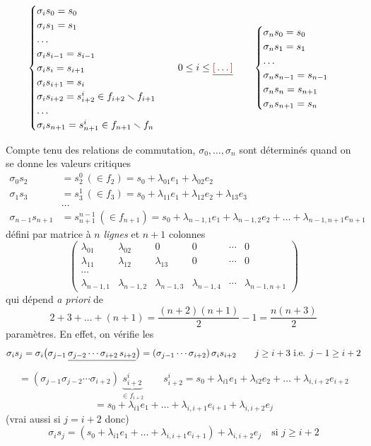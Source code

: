 \documentclass[11pt,a4paper]{article}
\begin{document}
\[
\begin{cases}
\sigma_i s_0 = s_0 \\
\sigma_i s_1 = s_1 \\
\dots \\
\sigma_i s_{i-1} = s_{i-1} \\
\sigma_i s_i = s_{i+1} \\
\sigma_i s_{i+1} = s_i \\
\sigma_i s_{i+2} = s_{i+2}^i \in f_{i+2}\smallsetminus f_{i+1} \\
\dots \\
\sigma_i s_{n+1} = s_{n+1}^i \in f_{n+1}\smallsetminus f_n
\end{cases}
\quad 0\leq i\leq \struck{\ill{}}
\qquad
\begin{cases}
\sigma_n s_0 = s_0 \\
\sigma_n s_1 = s_1 \\
\dots \\
\sigma_n s_{n-1} = s_{n-1} \\
\sigma_n s_n = s_{n+1} \\
\sigma_n s_{n+1} = s_n
\end{cases}
\]

Compte tenu des relations de commutation, $\sigma_0,\dots,\sigma_n$ sont déterminés quand on se donne les \struck{\ill{}} valeurs critiques \struck{\ill{}}
\[
\begin{aligned}
\sigma_0 s_2 &= s_2^0\ (\in f_2) = s_0+\lambda_{01}e_1+\lambda_{02}e_2 \\
\sigma_1 s_3 &= s_3^1\ (\in f_3) = s_0+\lambda_{11}e_1+\lambda_{12}e_2+\lambda_{13}e_3 \\
&\dots \\
\sigma_{n-1} s_{n+1} &= s_{n+1}^{n-1}\ (\in f_{n+1}) = s_0+\lambda_{n-1,1}e_1+\lambda_{n-1,2}e_2+\dots+\lambda_{n-1,n+1}e_{n+1}
\end{aligned}
\]
défini par  matrice à $n$ \emph{lignes} et $n+1$ colonnes
\[
\begin{pmatrix}
\lambda_{01} & \lambda_{02} & 0 & 0 & \cdots & 0 \\
\lambda_{11} & \lambda_{12} & \lambda_{13} & 0 & \cdots & 0 \\
\cdots & & & & & \\
\lambda_{n-1,1} & \lambda_{n-1,2} & \lambda_{n-1,3} & \lambda_{n-1,4} & \cdots & \lambda_{n-1,n+1}
\end{pmatrix}
\]
qui dépend \emph{a priori} de
\[
2+3+\dots+(n+1) = \frac{(n+2)(n+1)}{2}-1 = \frac{n(n+3)}{2}
\]
paramètres. En effet, on vérifie les
\[
\sigma_i s_j = \sigma_i\bigl(\sigma_{j-1}\,\struck{\sigma_{j-2}\cdots\sigma_{i+2}\,s_{i+2}}\bigr) = (\sigma_{j-1}\cdots\sigma_{i+2})\,\sigma_i s_{i+2}
\qquad j\geq i+3\ \text{i.e. } j-1\geq i+2
\]
\[
= (\sigma_{j-1}\sigma_{j-2}\cdots\sigma_{i+2})\,\underbrace{s_{i+2}^i}_{\in f_{i+2}} \qquad s_{i+2}^i = s_0+\lambda_{i1}e_1+\lambda_{i2}e_2+\dots+\lambda_{i,i+2}e_{i+2}
\]
\[
= s_0+\lambda_{i1}e_1+\dots+\lambda_{i,i+1}e_{i+1}+\lambda_{i,i+2}e_j
\]
(vrai aussi si $j=i+2$ donc)
\[
\boxed{\ \sigma_i s_j = (s_0+\lambda_{i1}e_1+\dots+\lambda_{i,i+1}e_{i+1})+\lambda_{i,i+2}e_j \quad\text{si } j\geq i+2\ }
\]
\end{document}
